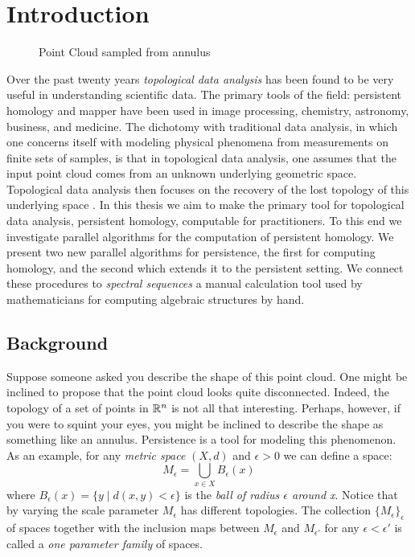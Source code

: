 \chapter{Introduction}
\begin{figure}
\centering
{}      
 \hspace{.5cm}
 \caption{Point Cloud sampled from annulus}
 \end{figure}
Over the past twenty years \emph{topological data analysis} has been found to be very useful in understanding scientific data. The primary tools of the field: persistent homology and mapper have been used in image processing, chemistry, astronomy, business, and medicine. The dichotomy with traditional data analysis, in which one concerns itself with modeling physical phenomena from measurements on finite sets of samples, is that in topological data analysis, one assumes that the input point cloud comes from an unknown underlying geometric space. Topological data analysis then focuses on the recovery of the lost topology of this underlying space \cite{c-tnd-09}. In this thesis we aim to make the primary tool for topological data analysis, persistent homology, computable for practitioners. To this end we investigate parallel algorithms for the computation of persistent homology. We present two new parallel algorithms for persistence, the first for computing homology, and the second which extends it to the persistent setting. We connect these procedures to \emph{spectral sequences} a manual calculation tool used by mathematicians for computing algebraic structures by hand.
\section{Background}
Suppose someone asked you describe the shape of this point cloud. One might be inclined to propose that the point cloud looks quite disconnected. Indeed, the topology of a set of points in $\mathbb{R}^n$ is not all that interesting. Perhaps, however, if you were to squint your eyes, you might be inclined to describe the shape as something like an annulus. Persistence is a tool for modeling this phenomenon. As an example, for any \emph{metric space} $(X,d)$ and  $\epsilon > 0$ we can define a space: \[ M_\epsilon = \bigcup_{x \in X} B_{\epsilon}(x) \] where $B_{\epsilon}(x) = \{ y \mid d(x,y) < \epsilon\} $ is the \emph{ball of radius $\epsilon$ around x}. Notice that by varying the scale parameter $M_\epsilon$ has different topologies. The collection $\{M_\epsilon\}_\epsilon$ of spaces together with the inclusion maps between $M_\epsilon$ and $M_{\epsilon'}$ for any $\epsilon < \epsilon'$ is called a \emph{one parameter family} of spaces.   
 
